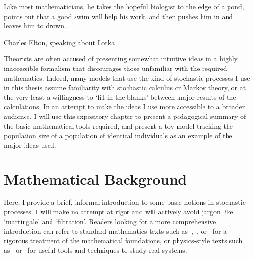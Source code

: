 \epigraph{\justifying Like most mathematicians, he takes the hopeful biologist to the edge of a pond, points out that a good swim will help his work, and then pushes him in and leaves him to drown.}{Charles Elton, speaking about Lotka~\citep{elton_eppur_1935}}

Theorists are often accused of presenting somewhat intuitive ideas in a highly inaccessible formalism that discourages those unfamiliar with the required mathematics. Indeed, many models that use the kind of stochastic processes I use in this thesis assume familiarity with stochastic calculus or Markov theory, or at the very least a willingness to `fill in the blanks' between major results of the calculations. In an attempt to make the ideas I use more accessible to a broader audience, I will use this expository chapter to present a pedagogical summary of the basic mathematical tools required, and present a toy model tracking the population size of a population of identical individuals as an example of the major ideas used.

\section{Mathematical Background}\label{sec_math_background}

Here, I provide a brief, informal introduction to some basic notions in stochastic processes. I will make no attempt at rigor and will actively avoid jargon like `martingale' and `filtration'. Readers looking for a more comprehensive introduction can refer to standard mathematics texts such as~\cite{oksendal_stochastic_1998},~\cite{ethier_markov_1986}, or~\cite{karatzas_brownian_1998} for a rigorous treatment of the mathematical foundations, or physics-style texts such as~\cite{gardiner_stochastic_2009} or~\cite{van_kampen_stochastic_1981} for useful tools and techniques to study real systems.

